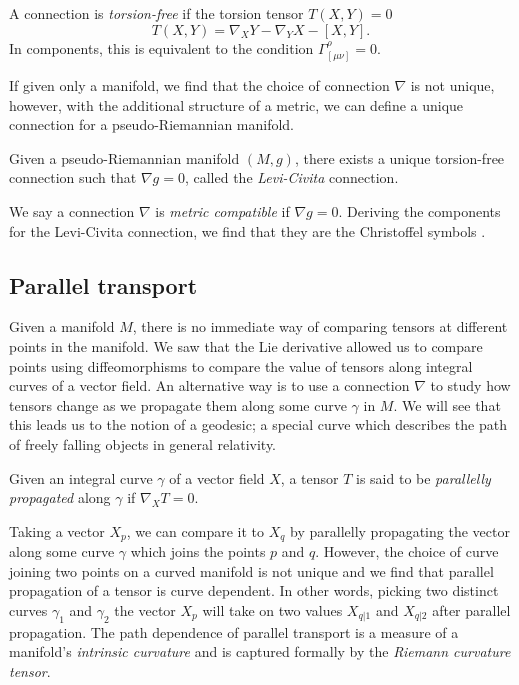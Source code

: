 \begin{defn}
	A connection is \emph{torsion-free} if the torsion tensor $T(X,Y) = 0$
	\begin{equation*}
		T(X,Y) = \nabla_X Y - \nabla_Y X - [X,Y] .
	\end{equation*}
	In components, this is equivalent to the condition $\Gamma_{[\mu \nu]}^\rho = 0$.
\end{defn}

If given only a manifold, we find that the choice of connection $\nabla$ is not unique, however, with the additional structure of a metric, we can define a unique connection for a pseudo-Riemannian manifold.
\begin{defn}
	Given a pseudo-Riemannian manifold $(M,g)$, there exists a unique torsion-free connection such that $\nabla g = 0$, called the \emph{Levi-Civita} connection.
\end{defn}
We say a connection $\nabla$ is \emph{metric compatible} if $\nabla g = 0$. Deriving the components for the Levi-Civita connection, we find that they are the Christoffel symbols .

\subsection{Parallel transport}
\label{sec:paralleltransport}

Given a manifold $M$, there is no immediate way of comparing tensors at different points in the manifold. We saw that the Lie derivative allowed us to compare points using diffeomorphisms to compare the value of tensors along integral curves of a vector field. An alternative way is to use a connection $\nabla$ to study how tensors change as we propagate them along some curve $\gamma$ in $M$. We will see that this leads us to the notion of a geodesic; a special curve which describes the path of freely falling objects in general relativity.

\begin{defn}
	Given an integral curve $\gamma$ of a vector field $X$, a tensor $T$ is said to be \emph{parallelly propagated} along $\gamma$ if $\nabla_X T = 0$.
\end{defn}

Taking a vector $X_p$, we can compare it to $X_q$ by parallelly propagating the vector along some curve $\gamma$ which joins the points $p$ and $q$. However, the choice of curve joining two points on a curved manifold is not unique and we find that parallel propagation of a tensor is curve dependent. In other words, picking two distinct curves $\gamma_1$ and $\gamma_2$ the vector $X_p$ will take on two values $X_{q|1}$ and $X_{q|2}$ after parallel propagation. The path dependence of parallel transport is a measure of a manifold's \emph{intrinsic curvature} and is captured formally by the \emph{Riemann curvature tensor}.

